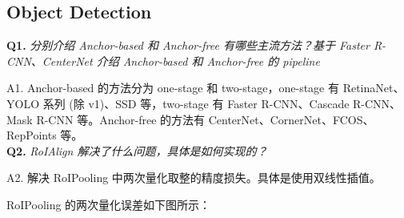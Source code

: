 \documentclass[cn,10pt,math=newtx,citestyle=gb7714-2015,bibstyle=gb7714-2015]{elegantbook}
\begin{document}
\subsection{Object Detection}

\textbf{Q1.} \textit{分别介绍 Anchor-based 和 Anchor-free 有哪些主流方法？基于 Faster R-CNN、CenterNet 介绍 Anchor-based 和 Anchor-free 的 pipeline}

A1. Anchor-based 的方法分为 one-stage 和 two-stage，one-stage 有 RetinaNet、YOLO 系列 (除 v1)、SSD 等，two-stage 有 Faster R-CNN、Cascade R-CNN、Mask R-CNN 等。Anchor-free 的方法有 CenterNet、CornerNet、FCOS、RepPoints 等。\\


\textbf{Q2.} \textit{RoIAlign 解决了什么问题，具体是如何实现的？}

A2. 解决 RoIPooling 中两次量化取整的精度损失。具体是使用双线性插值。

RoIPooling 的两次量化误差如下图所示：
\end{document}
